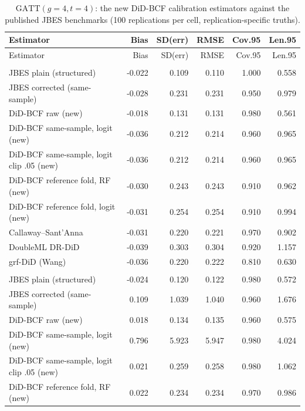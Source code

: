 {\footnotesize
\begin{longtable}{lrrrrr}
\caption{$\mathrm{GATT}(g{=}4,t{=}4)$: the new DiD-BCF calibration estimators against the published JBES benchmarks (100 replications per cell, replication-specific truths).}\label{tab:benchgatt}\\
\toprule
Estimator & Bias & SD(err) & RMSE & Cov.95 & Len.95 \\
\midrule
\endfirsthead
\toprule
Estimator & Bias & SD(err) & RMSE & Cov.95 & Len.95 \\
\midrule
\endhead
\bottomrule
\endlastfoot
\multicolumn{6}{l}{\textit{baseline, $N=200$, degree $d=1$}} \\
\quad JBES plain (structured) & -0.022 & 0.109 & 0.110 & 1.000 & 0.558 \\
\quad JBES corrected (same-sample) & -0.028 & 0.231 & 0.231 & 0.950 & 0.979 \\
\quad DiD-BCF raw (new) & -0.018 & 0.131 & 0.131 & 0.980 & 0.561 \\
\quad DiD-BCF same-sample, logit (new) & -0.036 & 0.212 & 0.214 & 0.960 & 0.965 \\
\quad DiD-BCF same-sample, logit clip .05 (new) & -0.036 & 0.212 & 0.214 & 0.960 & 0.965 \\
\quad DiD-BCF reference fold, RF (new) & -0.030 & 0.243 & 0.243 & 0.910 & 0.962 \\
\quad DiD-BCF reference fold, logit (new) & -0.031 & 0.254 & 0.254 & 0.910 & 0.994 \\
\quad Callaway--Sant'Anna & -0.031 & 0.220 & 0.221 & 0.970 & 0.902 \\
\quad DoubleML DR-DiD & -0.039 & 0.303 & 0.304 & 0.920 & 1.157 \\
\quad grf-DiD (Wang) & -0.036 & 0.220 & 0.222 & 0.810 & 0.630 \\
\addlinespace
\multicolumn{6}{l}{\textit{baseline, $N=200$, degree $d=2$}} \\
\quad JBES plain (structured) & -0.024 & 0.120 & 0.122 & 0.980 & 0.572 \\
\quad JBES corrected (same-sample) & 0.109 & 1.039 & 1.040 & 0.960 & 1.676 \\
\quad DiD-BCF raw (new) & 0.018 & 0.134 & 0.135 & 0.960 & 0.575 \\
\quad DiD-BCF same-sample, logit (new) & 0.796 & 5.923 & 5.947 & 0.980 & 4.024 \\
\quad DiD-BCF same-sample, logit clip .05 (new) & 0.021 & 0.259 & 0.258 & 0.980 & 1.062 \\
\quad DiD-BCF reference fold, RF (new) & 0.022 & 0.234 & 0.234 & 0.970 & 0.986 \\

\end{longtable}}
